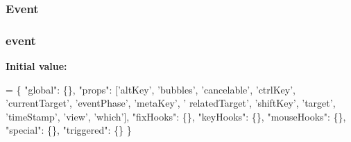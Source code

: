 \subsubsection[{\texorpdfstring{Event}{Event}}]{ Event}\hypertarget{jquery-2_82_81-vsdoc_8js_a2cc2bb482e56b47f47b4ee54d670a418}{}\label{jquery-2_82_81-vsdoc_8js_a2cc2bb482e56b47f47b4ee54d670a418}
\subsubsection[{\texorpdfstring{event}{event}}]{ event}\hypertarget{jquery-2_82_81-vsdoc_8js_a2ece9eec3df1cd48d8203e336e83563e}{}\label{jquery-2_82_81-vsdoc_8js_a2ece9eec3df1cd48d8203e336e83563e}
{\bfseries Initial value\+:}
\begin{DoxyCode}
= \{
        \textcolor{stringliteral}{"global"}: \{\},
        \textcolor{stringliteral}{"props"}: [\textcolor{stringliteral}{'altKey'}, \textcolor{stringliteral}{'bubbles'}, \textcolor{stringliteral}{'cancelable'}, \textcolor{stringliteral}{'ctrlKey'}, \textcolor{stringliteral}{'currentTarget'}, \textcolor{stringliteral}{'eventPhase'}, \textcolor{stringliteral}{'metaKey'}, \textcolor{stringliteral}{'
      relatedTarget'}, \textcolor{stringliteral}{'shiftKey'}, \textcolor{stringliteral}{'target'}, \textcolor{stringliteral}{'timeStamp'}, \textcolor{stringliteral}{'view'}, \textcolor{stringliteral}{'which'}],
        \textcolor{stringliteral}{"fixHooks"}: \{\},
        \textcolor{stringliteral}{"keyHooks"}: \{\},
        \textcolor{stringliteral}{"mouseHooks"}: \{\},
        \textcolor{stringliteral}{"special"}: \{\},
        \textcolor{stringliteral}{"triggered"}: \{\}
    \}
\end{DoxyCode}
